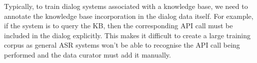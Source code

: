 Typically, to train dialog systems associated with a knowledge base, we need to annotate the knowledge base incorporation in the dialog data itself. For example, if the system is to query the KB, then the corresponding API call must be included in the dialog explicitly. This makes it difficult to create a large training corpus as general ASR systems won't be able to recognise the API call being performed and the data curator must add it manually.





